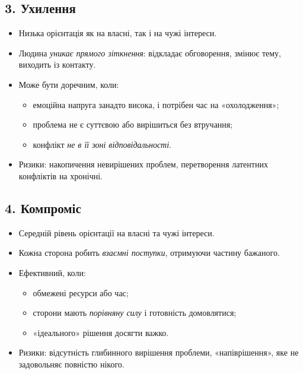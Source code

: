 \documentclass[12pt,a4paper]{article}
\begin{document}
    \subsection*{3. Ухилення}
    \begin{itemize}
        \item Низька орієнтація як на власні, так і на чужі інтереси.
        \item Людина \textit{уникає прямого зіткнення}: відкладає обговорення, змінює тему, виходить із контакту.
        \item Може бути доречним, коли:
        \begin{itemize}
            \item емоційна напруга занадто висока, і потрібен час на «охолодження»;
            \item проблема не є суттєвою або вирішиться без втручання;
            \item конфлікт \textit{не в її зоні відповідальності}.
        \end{itemize}
        \item Ризики: накопичення невирішених проблем, перетворення латентних конфліктів на хронічні.
    \end{itemize}

    \subsection*{4. Компроміс}
    \begin{itemize}
        \item Середній рівень орієнтації на власні та чужі інтереси.
        \item Кожна сторона робить \textit{взаємні поступки}, отримуючи частину бажаного.
        \item Ефективний, коли:
        \begin{itemize}
            \item обмежені ресурси або час;
            \item сторони мають \textit{порівняну силу} і готовність домовлятися;
            \item «ідеального» рішення досягти важко.
        \end{itemize}
        \item Ризики: відсутність глибинного вирішення проблеми, «напіврішення», яке не задовольняє повністю нікого.
    \end{itemize}
\end{document}
